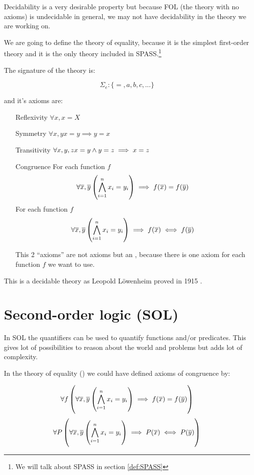 Decidability is a very desirable property but because \gls{FOL} (the theory with no axioms) is undecidable in general, we may not have decidability in the theory we are working on.

\begin{example}
\label{theory:equality}
We are going to define the theory of equality, because it is the simplest first-order theory and it is the only theory included in SPASS.\footnote{We will talk about SPASS in section \ref{def:SPASS}}

The signature of the theory is:

\[\Sigma_e:\{=,a,b,c,...\}\]

and it's axioms are:

\begin{itemize}
	\item[Reflexivity] $\forall x, x=X$
	\item[Symmetry] $\forall x,y x=y \implies y=x$
	\item[Transitivity] $\forall x,y,z x=y \wedge y=z \implies x=z$
	\item[Congruence]
	\subitem[Function] For each function $f$
	\[\forall \overline{x},\overline{y} \left( \bigwedge_{i=1}^n x_i = y_i \right) \implies f(\overline{x}) = f(\overline{y})\]
	\subitem[Predicate] For each function $f$
	\[\forall \overline{x},\overline{y} \left( \bigwedge_{i=1}^n x_i = y_i \right) \implies f(\overline{x}) \iff f(\overline{y})\]

	This 2 ``axioms'' are not axioms but an , because there is one axiom for each function $f$ we want to use.
\end{itemize}

This is a decidable theory as Leopold Löwenheim proved in 1915 \cite{EqualityIsDecidable}.
\end{example}

\section{Second-order logic (SOL)}

In \gls{SOL} the quantifiers can be used to quantify functions and/or predicates. This gives lot of possibilities to reason about the world and problems but adds lot of complexity.

In the theory of equality (\label{theory:equality}) we could have defined axioms of congruence by:

\[\forall f \left( \forall \overline{x},\overline{y} \left( \bigwedge_{i=1}^n x_i = y_i \right) \implies f(\overline{x}) = f(\overline{y}) \right)\]
\[\forall P \left( \forall \overline{x},\overline{y} \left( \bigwedge_{i=1}^n x_i = y_i \right) \implies P(\overline{x}) \iff P(\overline{y}) \right)\]

